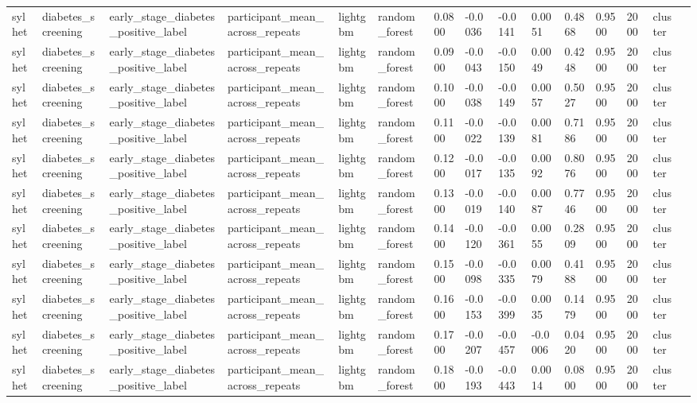 \begin{tabular}{lllllllllllllll}
sylhet & diabetes\_screening & early\_stage\_diabetes\_positive\_label & participant\_mean\_across\_repeats & lightgbm & random\_forest & 0.0800 & -0.0036 & -0.0141 & 0.0051 & 0.4868 & 0.9500 & 2000 & cluster &  \\
sylhet & diabetes\_screening & early\_stage\_diabetes\_positive\_label & participant\_mean\_across\_repeats & lightgbm & random\_forest & 0.0900 & -0.0043 & -0.0150 & 0.0049 & 0.4248 & 0.9500 & 2000 & cluster &  \\
sylhet & diabetes\_screening & early\_stage\_diabetes\_positive\_label & participant\_mean\_across\_repeats & lightgbm & random\_forest & 0.1000 & -0.0038 & -0.0149 & 0.0057 & 0.5027 & 0.9500 & 2000 & cluster &  \\
sylhet & diabetes\_screening & early\_stage\_diabetes\_positive\_label & participant\_mean\_across\_repeats & lightgbm & random\_forest & 0.1100 & -0.0022 & -0.0139 & 0.0081 & 0.7186 & 0.9500 & 2000 & cluster &  \\
sylhet & diabetes\_screening & early\_stage\_diabetes\_positive\_label & participant\_mean\_across\_repeats & lightgbm & random\_forest & 0.1200 & -0.0017 & -0.0135 & 0.0092 & 0.8076 & 0.9500 & 2000 & cluster &  \\
sylhet & diabetes\_screening & early\_stage\_diabetes\_positive\_label & participant\_mean\_across\_repeats & lightgbm & random\_forest & 0.1300 & -0.0019 & -0.0140 & 0.0087 & 0.7746 & 0.9500 & 2000 & cluster &  \\
sylhet & diabetes\_screening & early\_stage\_diabetes\_positive\_label & participant\_mean\_across\_repeats & lightgbm & random\_forest & 0.1400 & -0.0120 & -0.0361 & 0.0055 & 0.2809 & 0.9500 & 2000 & cluster &  \\
sylhet & diabetes\_screening & early\_stage\_diabetes\_positive\_label & participant\_mean\_across\_repeats & lightgbm & random\_forest & 0.1500 & -0.0098 & -0.0335 & 0.0079 & 0.4188 & 0.9500 & 2000 & cluster &  \\
sylhet & diabetes\_screening & early\_stage\_diabetes\_positive\_label & participant\_mean\_across\_repeats & lightgbm & random\_forest & 0.1600 & -0.0153 & -0.0399 & 0.0035 & 0.1479 & 0.9500 & 2000 & cluster &  \\
sylhet & diabetes\_screening & early\_stage\_diabetes\_positive\_label & participant\_mean\_across\_repeats & lightgbm & random\_forest & 0.1700 & -0.0207 & -0.0457 & -0.0006 & 0.0420 & 0.9500 & 2000 & cluster &  \\
sylhet & diabetes\_screening & early\_stage\_diabetes\_positive\_label & participant\_mean\_across\_repeats & lightgbm & random\_forest & 0.1800 & -0.0193 & -0.0443 & 0.0014 & 0.0800 & 0.9500 & 2000 & cluster &  \\

\end{tabular}
